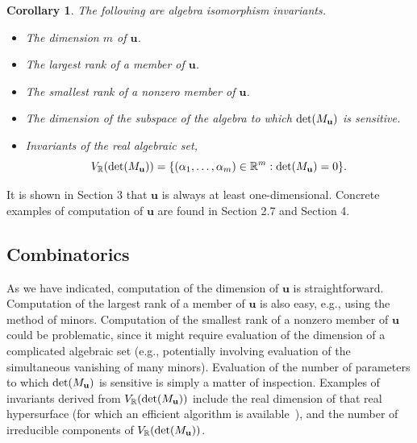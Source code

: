 \documentclass{amsart}
\numberwithin{equation}{section}
\newtheorem{corollary}[theorem]{Corollary}
\theoremstyle{definition}
\numberwithin{theorem}{section}
\begin{document}
  \begin{corollary}\label{8/18/23.2} The following are algebra isomorphism invariants. \begin{itemize} \item The dimension $m$ of $\mathbf{u}$.   \item The largest rank  of a member of $\mathbf{u}$.  \item The smallest rank of a nonzero member of $\mathbf{u}$. \item The dimension of the subspace of the algebra to which ${\rm det}(M_{\mathbf{u}})$ is sensitive. \item Invariants of the real algebraic set, \[V_\mathbb{R}({\rm det}(M_{\mathbf{u}})) = \{(\alpha_1,\dots,\alpha_m)\in\mathbb{R}^m: {\rm det}(M_{\mathbf{u}}) = 0 \}.\] \end{itemize} \end{corollary}
  
   It is shown in Section 3 that $\mathbf{u}$ is always at least one-dimensional.   Concrete examples of computation of $\mathbf{u}$ are found in Section 2.7 and Section 4.  
  
\subsection{Combinatorics} As we have indicated, computation of the dimension of $\mathbf{u}$ is straightforward.  Computation of the largest rank of a member of $\mathbf{u}$ is also easy, e.g., using the method of minors.  Computation of the smallest rank of a nonzero member of $\mathbf{u}$ could be problematic, since it might require evaluation of the dimension of a complicated algebraic set (e.g., potentially involving evaluation of the simultaneous vanishing of many minors).  Evaluation of the number of parameters to which ${\rm det}(M_{\mathbf{u}})$ is sensitive is simply a matter of inspection.  Examples of invariants derived from $V_\mathbb{R}({\rm det}(M_{\mathbf{u}}))$ include the real dimension of that real hypersurface (for which an efficient algorithm is \mbox{available \cite{bannwarth:2015})}, and the number of irreducible components of $V_\mathbb{R}({\rm det}(M_{\mathbf{u}}))$.  
 
\end{document}
